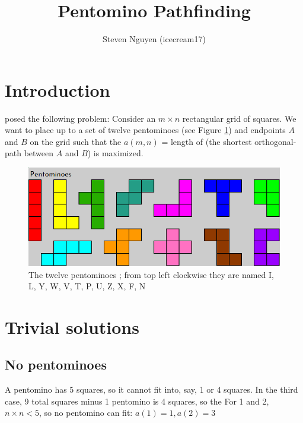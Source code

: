\documentclass{article}
\title{Pentomino Pathfinding}
\author{Steven Nguyen (icecream17)}
\begin{document}
\maketitle


\section{Introduction}

\cite{deckard1} posed the following problem: Consider an $m \times n$ rectangular grid of squares.
We want to place up to a set of twelve pentominoes (see Figure \ref{fig:pentominoes}) and endpoints $A$ and $B$
on the grid such that the $a(m, n)$ = length of (the shortest orthogonal-path between $A$ and $B$) is maximized.

\begin{figure}[!h]
    \centering
    \includegraphics[width=0.5\linewidth]{pentominoes.png}
    \caption{The twelve pentominoes \cite{sheet};
    from top left clockwise they are named I, L, Y, W, V, T, P, U, Z, X, F, N}
    \label{fig:pentominoes}
\end{figure}

\section{Trivial solutions}

\subsection{No pentominoes}

A pentomino has 5 squares, so it cannot fit into, say, 1 or 4 squares. In the third case, 9 total squares minus 1 pentomino is 4 squares, so the 
For 1 and 2, $n \times n < 5$, so no pentomino can fit: $a(1) = 1, a(2) = 3$

\end{document}
